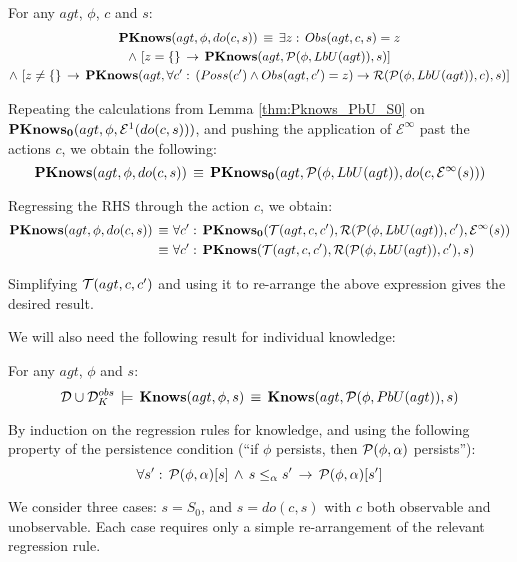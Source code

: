 \begin{thm}
\label{thm:Pknows_PbU_do}For any $agt$, $\phi$, $c$ and $s$:\begin{multline*}
\mathbf{PKnows}(agt,\phi,do(c,s))\,\equiv\,\exists z:\, Obs(agt,c,s)=z\\
\wedge\,\left[z=\{\}\,\rightarrow\,\mathbf{PKnows}(agt,\mathcal{P}(\phi,LbU(agt)),s)\right]\\
\wedge\,\left[z\neq\{\}\,\rightarrow\,\mathbf{PKnows}(agt,\forall c':\,\left(Poss(c')\wedge Obs(agt,c')=z\right)\rightarrow\mathcal{R}(\mathcal{P}(\phi,LbU(agt)),c),s)\right]\end{multline*}

\end{thm}
\begin{proofsketch}
Repeating the calculations from Lemma \ref{thm:Pknows_PbU_S0} on
$\mathbf{PKnows_{0}}(agt,\phi,\mathcal{E}^{1}(do(c,s)))$, and pushing the application
of $\mathcal{E}^{\infty}$ past the actions $c$, we obtain the following:\[
\mathbf{PKnows}(agt,\phi,do(c,s))\,\equiv\,\mathbf{PKnows_{0}}(agt,\mathcal{P}(\phi,LbU(agt)),do(c,\mathcal{E}^{\infty}(s)))\]


Regressing the RHS through the action $c$, we obtain:\begin{align*}
\mathbf{PKnows}(agt,\phi,do(c,s))\,\equiv\,\, & \forall c':\,\mathbf{PKnows_{0}}(\mathcal{T}(agt,c,c'),\mathcal{R}(\mathcal{P}(\phi,LbU(agt)),c'),\mathcal{E}^{\infty}(s))\\
\equiv\,\, & \forall c':\,\mathbf{PKnows}(\mathcal{T}(agt,c,c'),\mathcal{R}(\mathcal{P}(\phi,LbU(agt)),c'),s)\end{align*}


Simplifying $\mathcal{T}(agt,c,c')$ and using it to re-arrange the above
expression gives the desired result. 
\end{proofsketch}
We will also need the following result for individual knowledge:

\begin{thm}
\label{thm:Knows_impl_KnowsPbU}For any $agt$, $\phi$ and $s$:\[
\mathcal{D}\cup\mathcal{D}_{K}^{obs}\,\models\,\mathbf{Knows}(agt,\phi,s)\,\equiv\,\mathbf{Knows}(agt,\mathcal{P}(\phi,PbU(agt)),s)\]

\end{thm}
\begin{proofsketch}
By induction on the regression rules for knowledge, and using the
following property of the persistence condition ({}``if $\phi$ persists,
then $\mathcal{P}(\phi,\alpha)$ persists''):\[
\forall s':\,\mathcal{P}(\phi,\alpha)[s]\,\wedge\, s\leq_{\alpha}s'\,\rightarrow\,\mathcal{P}(\phi,\alpha)[s']\]


We consider three cases: $s=S_{0}$, and $s=do(c,s)$ with $c$ both
observable and unobservable. Each case requires only a simple re-arrangement
of the relevant regression rule. 
\end{proofsketch}
\medskip{}


